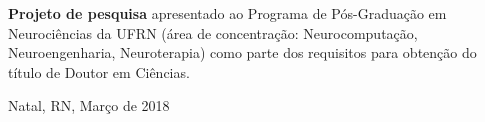 \begin{titlepage}
\begin{center}
\vfill

\hfill
\parbox{0.5\linewidth}{
	\textbf{Projeto de pesquisa}
	apresentado ao Programa de Pós-Graduação em Neurociências da UFRN
	(área de concentração: Neurocomputação, Neuroengenharia, Neuroterapia)
	como parte dos requisitos para obtenção do título de
	Doutor em Ciências.
}

\vfill

\large


Natal, RN, Março de 2018

\end{center}

\end{titlepage}
